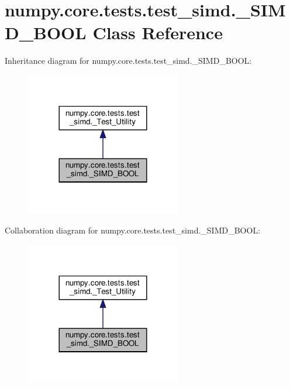 \hypertarget{classnumpy_1_1core_1_1tests_1_1test__simd_1_1__SIMD__BOOL}{}\section{numpy.\+core.\+tests.\+test\+\_\+simd.\+\_\+\+S\+I\+M\+D\+\_\+\+B\+O\+OL Class Reference}
\label{classnumpy_1_1core_1_1tests_1_1test__simd_1_1__SIMD__BOOL}


Inheritance diagram for numpy.\+core.\+tests.\+test\+\_\+simd.\+\_\+\+S\+I\+M\+D\+\_\+\+B\+O\+OL\+:
\nopagebreak
\begin{figure}[H]
\begin{center}
\leavevmode
\includegraphics[width=192pt]{classnumpy_1_1core_1_1tests_1_1test__simd_1_1__SIMD__BOOL__inherit__graph}
\end{center}
\end{figure}


Collaboration diagram for numpy.\+core.\+tests.\+test\+\_\+simd.\+\_\+\+S\+I\+M\+D\+\_\+\+B\+O\+OL\+:
\nopagebreak
\begin{figure}[H]
\begin{center}
\leavevmode
\includegraphics[width=192pt]{classnumpy_1_1core_1_1tests_1_1test__simd_1_1__SIMD__BOOL__coll__graph}
\end{center}
\end{figure}

